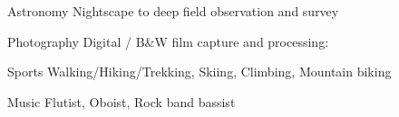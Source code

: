 
\begin{cvskills}

	\cvskill
	{Astronomy}
    {Nightscape to deep field observation and survey}

	\cvskill
	{Photography}
    {Digital / B\&W film capture and processing: }

	\cvskill
    {Sports}
    {Walking/Hiking/Trekking, Skiing, Climbing, Mountain biking}

	\cvskill
    {Music}
    {Flutist, Oboist, Rock band bassist}

\end{cvskills}
